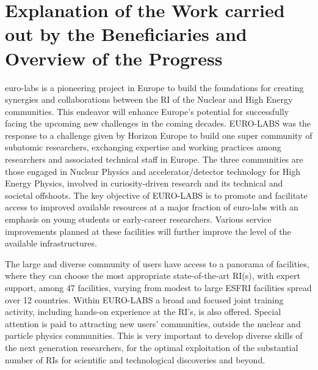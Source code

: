 
\clearpage
\section{Explanation of the Work carried out by the Beneficiaries and Overview of the Progress}
\label{sec:work-carried-out}

\acrshort{euro-labs} is a pioneering project in Europe to build the foundations for creating synergies and collaborations between the \acrfull{RI} of the Nuclear and High Energy communities. This endeavor will enhance Europe's potential for successfully facing the upcoming new challenges in the coming decades. EURO-LABS was the response to a challenge given by Horizon Europe to build one super community of subatomic researchers, exchanging expertise and working practices among researchers and associated technical staff in Europe. The three communities are those engaged in Nuclear Physics and accelerator/detector technology for High Energy Physics, involved in curiosity-driven research and its technical and societal offshoots. The key objective of EURO-LABS is to promote and facilitate access to improved available resources at a major fraction of \acrlong{euro-labs} with an emphasis on young students or early-career researchers. Various service improvements planned at these facilities will further improve the level of the available infrastructures. 

The large and diverse community of users have access to a panorama of facilities, where they can choose the most appropriate state-of-the-art RI(s), with expert support, among 47 facilities, varying from modest to large ESFRI facilities spread over 12 countries. Within EURO-LABS a broad and focused joint training activity, including hands-on experience at the RI’s, is also offered. Special attention is paid to attracting new users' communities, outside the nuclear and particle physics communities. This is very important to develop diverse skills of the next generation researchers, for the optimal exploitation of the substantial number of RIs for scientific and technological discoveries and beyond. 

